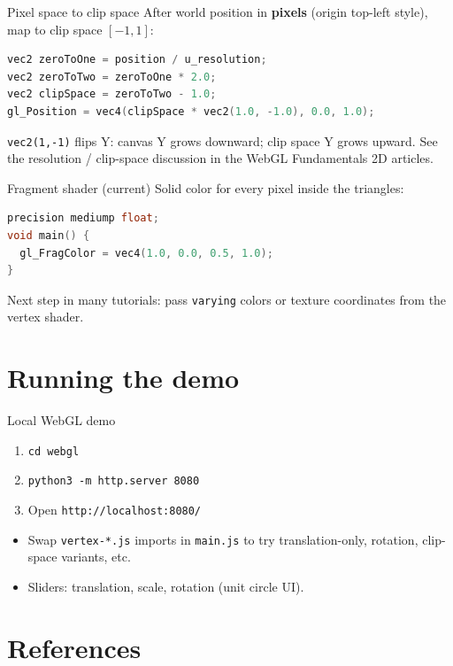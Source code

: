 \documentclass[aspectratio=169]{beamer}
\begin{document}
\begin{frame}[fragile]{Pixel space to clip space}
  After world position in \textbf{pixels} (origin top-left style), map to clip space $[-1,1]$:
\begin{lstlisting}[language=C]
vec2 zeroToOne = position / u_resolution;
vec2 zeroToTwo = zeroToOne * 2.0;
vec2 clipSpace = zeroToTwo - 1.0;
gl_Position = vec4(clipSpace * vec2(1.0, -1.0), 0.0, 1.0);
\end{lstlisting}
  \texttt{vec2(1,-1)} flips Y: canvas Y grows downward; clip space Y grows upward.
  \vfill
  \small
  See the resolution / clip-space discussion in the WebGL Fundamentals 2D articles.
\end{frame}

\begin{frame}[fragile]{Fragment shader (current)}
  Solid color for every pixel inside the triangles:
\begin{lstlisting}[language=C]
precision mediump float;
void main() {
  gl_FragColor = vec4(1.0, 0.0, 0.5, 1.0);
}
\end{lstlisting}
  Next step in many tutorials: pass \texttt{varying} colors or texture coordinates from the vertex shader.
\end{frame}

\section{Running the demo}

\begin{frame}{Local WebGL demo}
  \begin{enumerate}
    \item \texttt{cd webgl}
    \item \texttt{python3 -m http.server 8080}
    \item Open \texttt{http://localhost:8080/}
  \end{enumerate}
  \vfill
  \begin{itemize}
    \item Swap \texttt{vertex-*.js} imports in \texttt{main.js} to try translation-only, rotation, clip-space variants, etc.
    \item Sliders: translation, scale, rotation (unit circle UI).
  \end{itemize}
\end{frame}

\section{References}
\end{document}
